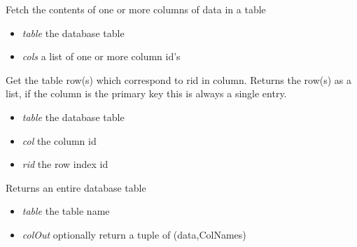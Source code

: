 \documentclass[a4paper,11pt,english]{sphinxmanual}
\begin{document}
\begin{fulllineitems}

\begin{fulllineitems}
\label{modules_doc:cbmpy.CBNetDB.DBTools.getColumns}
Fetch the contents of one or more columns of data in a table
\begin{itemize}
\item {} 
\emph{table} the database table

\item {} 
\emph{cols} a list of one or more column id's

\end{itemize}

\end{fulllineitems}


\begin{fulllineitems}
\label{modules_doc:cbmpy.CBNetDB.DBTools.getRow}
Get the table row(s) which correspond to rid in column. Returns the row(s) as a list, if the column is the primary key
this is always a single entry.
\begin{itemize}
\item {} 
\emph{table} the database table

\item {} 
\emph{col} the column id

\item {} 
\emph{rid} the row index id

\end{itemize}

\end{fulllineitems}


\begin{fulllineitems}
\label{modules_doc:cbmpy.CBNetDB.DBTools.getTable}
Returns an entire database table
\begin{itemize}
\item {} 
\emph{table} the table name

\item {} 
\emph{colOut} optionally return a tuple of (data,ColNames)

\end{itemize}


\end{fulllineitems}
\end{fulllineitems}
\end{document}
